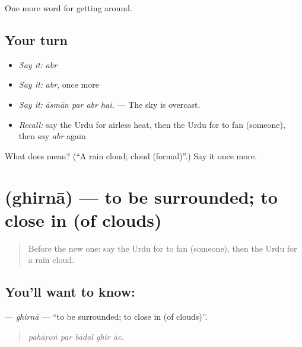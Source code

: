 \begin{grammarlens}[title={What you've built}]
One more word for getting around.
\end{grammarlens}

\subsection*{Your turn}
\begin{itemize}
\raggedright
  \item \emph{Say it:} \emph{abr}
  \item \emph{Say it:} \emph{abr}, once more
  \item \emph{Say it:} \emph{āsmān par abr hai.} — The sky is overcast.
  \item \emph{Recall:} say the Urdu for airless heat, then the Urdu for to fan (someone), then say \emph{abr} again
\end{itemize}

\begin{tcolorbox}[breakable,colback=teal!4,colframe=teal!35!black,title={Before you move on}]
What does  mean? (\textquotedblleft{}A rain cloud; cloud (formal)\textquotedblright{}.) Say it once more.
\end{tcolorbox}
\section[\texorpdfstring{\ur{گھرنا} (ghirnā)}{گھرنا (ghirnā)}]{ (ghirnā) — to be surrounded; to close in (of clouds)}

\label{lesson:UR-C431-ghirna}



\begin{quote}
Before the new one: say the Urdu for to fan (someone), then the Urdu for a rain cloud.
\end{quote}

\subsection*{You'll want to know: }
\textbf{} — \emph{ghirnā} — \textquotedblleft{}to be surrounded; to close in (of clouds)\textquotedblright{}.

\begin{quote}
    
\end{quote}

\begin{quote}
\emph{pahāṛoṅ par bādal ghir āe.}
\end{quote}

